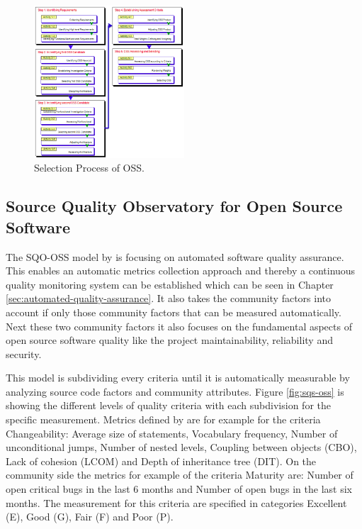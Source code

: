 \documentclass[DIV=calc,paper=a4,fontsize=9pt,twocolumn]{scrartcl}
\begin{document}
\begin{figure}[ht]
    \includegraphics[width=0.5\textwidth ]{img/selectionprocess.png}{}
    \centering
    \caption{Selection Process of OSS. \citet{lee2007study}}\label{fig:selection-process.png}
\end{figure}

\subsection{Source Quality Observatory for Open Source Software}

The SQO-OSS model by \citet{samoladas2008sqo} is focusing on automated software quality assurance. This enables an automatic metrics collection approach and thereby a continuous quality monitoring system can be established which can be seen in Chapter \ref{sec:automated-quality-assurance}. It also takes the community factors into account if only those community factors that can be measured automatically. Next these two community factors it also focuses on the fundamental aspects of open source software quality like the project maintainability, reliability and security.

This model is subdividing every criteria until it is automatically measurable by analyzing source code factors and community attributes. Figure \ref{fig:sqs-oss} is showing the different levels of quality criteria with each subdivision for the specific measurement. Metrics defined by \citet{samoladas2008sqo} are for example for the criteria Changeability: Average size of statements, Vocabulary frequency, Number of unconditional jumps, Number of nested levels, Coupling between objects (CBO), Lack of cohesion (LCOM) and Depth of inheritance tree (DIT). On the community side the metrics for example of the criteria Maturity are: Number of open critical bugs in the last 6 months and Number of open bugs in the last six months. The measurement for this criteria are specified in categories Excellent (E), Good (G), Fair (F) and Poor (P). \citep{samoladas2008sqo}
\end{document}
